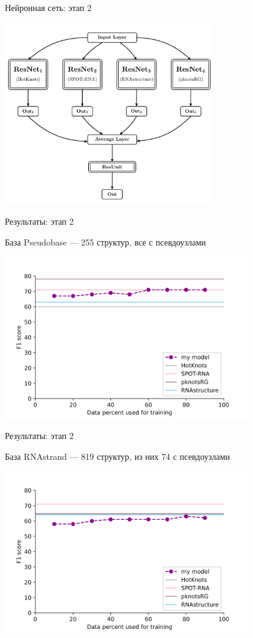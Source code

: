 \documentclass{beamer}
\begin{document}
\begin{frame}{Нейронная сеть: этап 2}

\centering
\includegraphics[width=9.0cm]{pics/nn.pdf}

    
\end{frame}


\begin{frame}{Результаты: этап 2}

База Pseudobase --- 255 структур, все с псевдоузлами

\centering
\includegraphics[width=10.5cm]{pics/plot_pb.png}

\end{frame}

\begin{frame}{Результаты: этап 2}

База RNAstrand --- 819 структур, из них 74 с псевдоузлами

\centering
\includegraphics[width=10.5cm]{pics/plot_rs.png}

\end{frame}
\end{document}
